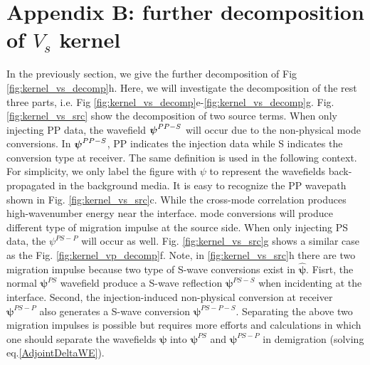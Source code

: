 \section{Appendix B: further decomposition of $V_s$ kernel}
In the previously section, we give the further decomposition of Fig \ref{fig:kernel_vs_decomp}h. Here, we will
investigate the decomposition of the rest three parts, i.e. Fig
\ref{fig:kernel_vs_decomp}e-\ref{fig:kernel_vs_decomp}g.
Fig. \ref{fig:kernel_vs_src} show the decomposition of two source terms. 
When only injecting PP data, the wavefield $\boldsymbol{{}\psi}^{PP-S}$ 
will occur due to the non-physical mode conversions.
In $\boldsymbol{{}\psi}^{PP-S}$, PP indicates the injection data while S indicates the conversion type at receiver.
The same definition is used in the following context.
For simplicity, we only label the figure with $\psi$ to represent the wavefields 
back-propagated in the background media.
It is easy to recognize the PP wavepath shown in Fig. \ref{fig:kernel_vs_src}c. 
While the cross-mode correlation produces high-wavenumber energy near the interface. 
mode conversions will produce different type
of migration impulse at the source side. 
When only injecting PS data, the $\psi^{PS-P}$ will occur as well.
Fig. \ref{fig:kernel_vs_src}g shows a similar case as the Fig. \ref{fig:kernel_vp_decomp}f.
Note, in \ref{fig:kernel_vs_src}h there are 
two migration impulse because two type of S-wave conversions exist in $\boldsymbol{\hat\psi}$. Fisrt,
the normal $\boldsymbol{\psi}^{PS}$ wavefield produce a S-wave reflection $\boldsymbol{\psi}^{PS-S}$
when incidenting at the interface. Second, the injection-induced non-physical conversion at receiver
$\boldsymbol{\psi}^{PS-P}$ also generates a S-wave conversion $\boldsymbol{\psi}^{PS-P-S}$. 
Separating the above two migration impulses is possible but requires more efforts and calculations in which one
should separate the wavefields $\boldsymbol{\psi}$ into $\boldsymbol{\psi}^{PS}$ and $\boldsymbol{\psi}^{PS-P}$ in
demigration (solving eq.\eqref{AdjointDeltaWE}). 

